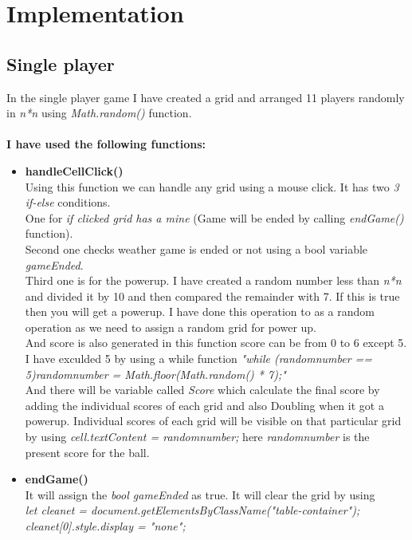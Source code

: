 \documentclass[a4paper, 11pt]{article}
\begin{document}
\section{Implementation}
\subsection{Single player}
    In the single player game I have created a grid and arranged 11 players randomly in \textit{n*n} using \textit{Math.random()} function.\\ \\
    \textbf{I have used the following functions:} 
    \begin{itemize}
        \item \textbf{handleCellClick()} \\ Using this function we can handle any grid using a mouse click. It has two \textit{3 if-else} conditions. \\ One for \textit{if clicked grid has a mine} (Game will be ended by calling \textit{endGame()} function). \\ Second one checks weather game is ended or not using a bool variable \textit{gameEnded}. \\ Third one is for the powerup. I have created a random number less than \textit{n*n} and divided it by 10 and then compared the remainder with 7. If this is true then you will get a powerup. I have done this operation to as a random operation as we need to assign a random grid for power up.\\And score is also generated in this function score can be from 0 to 6 except 5. I have exculded 5 by using a while function \textit{"while (randomnumber == 5){randomnumber = Math.floor(Math.random() * 7);"}}\\
        And there will be variable called \textit{Score} which calculate the final score by adding the individual scores of each grid and also Doubling when it got a powerup. Individual scores of each grid will be visible on that particular grid by using \textit{cell.textContent = randomnumber;} here \textit{randomnumber} is the present score for the ball.
        \item \textbf{endGame()}
        \\ It will assign the \textit{bool gameEnded} as true. It will clear the grid by using \\ \textit{    let cleanet = document.getElementsByClassName("table-container"); \\cleanet[0].style.display = "none";}\\

\end{itemize}
\end{document}
